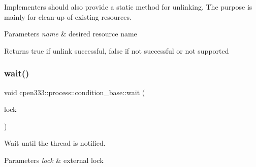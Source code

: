 Implementers should also provide a static method for unlinking. The purpose is mainly for clean-\/up of existing resources.


\begin{DoxyParams}{Parameters}
{\em name} & desired resource name \\
\hline
\end{DoxyParams}
\begin{DoxyReturn}{Returns}
{\ttfamily true} if unlink successful, {\ttfamily false} if not successful or not supported 
\end{DoxyReturn}
\mbox{\label{classcpen333_1_1process_1_1condition__base_a29b67e4579cef831f709ea4c3a32ffe5}} 
\subsubsection{\texorpdfstring{wait()}{wait()}\hspace{0.1cm}{\footnotesize\ttfamily [1/2]}}
{\footnotesize\ttfamily void cpen333\+::process\+::condition\+\_\+base\+::wait (\begin{DoxyParamCaption}\item[{std\+::unique\+\_\+lock$<$ \hyperlink{classcpen333_1_1process_1_1mutex}{cpen333\+::process\+::mutex} $>$ \&}]{lock }\end{DoxyParamCaption})\hspace{0.3cm}{\ttfamily [inline]}}



Wait until the thread is notified. 


\begin{DoxyParams}{Parameters}
{\em lock} & external lock \\
\hline
\end{DoxyParams}
\mbox{\label{classcpen333_1_1process_1_1condition__base_a3132db3bcedcddf3a8e5ac24df8d9efa}} 
